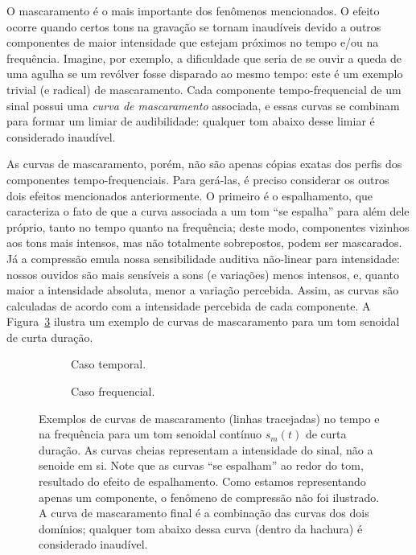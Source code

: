 O mascaramento é o mais importante dos fenômenos mencionados. O efeito ocorre quando certos tons na gravação se tornam inaudíveis devido a outros componentes de maior intensidade que estejam próximos no tempo e/ou na frequência. Imagine, por exemplo, a dificuldade que seria de se ouvir a queda de uma agulha se um revólver fosse disparado ao mesmo tempo: este é um exemplo trivial (e radical) de mascaramento. Cada componente tempo-frequencial de um sinal possui uma \emph{curva de mascaramento} associada, e essas curvas se combinam para formar um limiar de audibilidade: qualquer tom abaixo desse limiar é considerado inaudível.

As curvas de mascaramento, porém, não são apenas cópias exatas dos perfis dos componentes tempo-frequenciais. Para gerá-las, é preciso considerar os outros dois efeitos mencionados anteriormente. O primeiro é o espalhamento, que caracteriza o fato de que a curva associada a um tom ``se espalha'' para além dele próprio, tanto no tempo quanto na frequência; deste modo, componentes vizinhos aos tons mais intensos, mas não totalmente sobrepostos, podem ser mascarados. Já a compressão emula nossa sensibilidade auditiva não-linear para intensidade: nossos ouvidos são mais sensíveis a sons (e variações) menos intensos, e, quanto maior a intensidade absoluta, menor a variação percebida. Assim, as curvas são calculadas de acordo com a intensidade percebida de cada componente. A Figura~\ref{fig:metrics:masking} ilustra um exemplo de curvas de mascaramento para um tom senoidal de curta duração.
\begin{figure}[!ht]
    \centering
     \begin{subfigure}[t]{\textwidth}
        \centering
        
        \caption{Caso temporal.}
        \label{fig:metrics:time-masking}
    \end{subfigure}

    \medskip

    \begin{subfigure}[t]{\textwidth}
        \centering
        
        \caption{Caso frequencial.}
        \label{fig:metrics:frequency-masking}
    \end{subfigure}

    \caption[Exemplos de curvas de mascaramento no tempo e na frequência]{Exemplos de curvas de mascaramento (linhas tracejadas) no tempo e na frequência para um tom senoidal contínuo $s_m(t)$ de curta duração. As curvas cheias representam a intensidade do sinal, não a senoide em si. Note que as curvas ``se espalham'' ao redor do tom, resultado do efeito de espalhamento. Como estamos representando apenas um componente, o fenômeno de compressão não foi ilustrado. A curva de mascaramento final é a combinação das curvas dos dois domínios; qualquer tom abaixo dessa curva (dentro da hachura) é considerado inaudível.}
    \label{fig:metrics:masking}
\end{figure}

